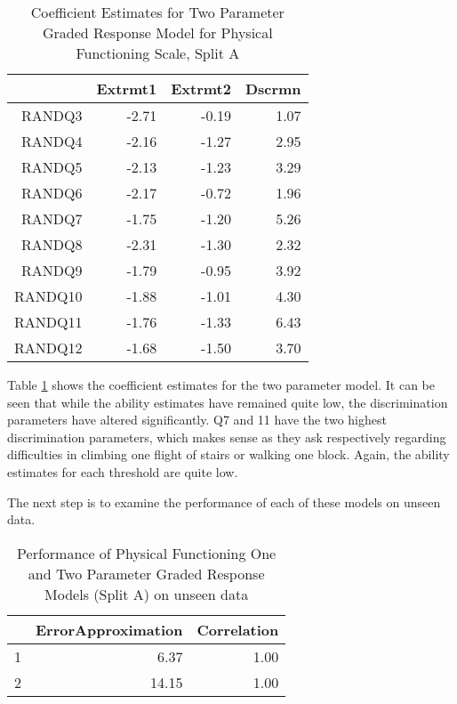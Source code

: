 \documentclass{article}
\begin{document}
\begin{table}[ht]
\centering
\begin{tabular}{rrrr}
  \hline
 & Extrmt1 & Extrmt2 & Dscrmn \\ 
  \hline
RANDQ3 & -2.71 & -0.19 & 1.07 \\ 
  RANDQ4 & -2.16 & -1.27 & 2.95 \\ 
  RANDQ5 & -2.13 & -1.23 & 3.29 \\ 
  RANDQ6 & -2.17 & -0.72 & 1.96 \\ 
  RANDQ7 & -1.75 & -1.20 & 5.26 \\ 
  RANDQ8 & -2.31 & -1.30 & 2.32 \\ 
  RANDQ9 & -1.79 & -0.95 & 3.92 \\ 
  RANDQ10 & -1.88 & -1.01 & 4.30 \\ 
  RANDQ11 & -1.76 & -1.33 & 6.43 \\ 
  RANDQ12 & -1.68 & -1.50 & 3.70 \\ 
   \hline
\end{tabular}
\caption{Coefficient Estimates for Two Parameter Graded Response Model for Physical Functioning Scale, Split A} 
\label{tab:physfun2agrm2pl}
\end{table}
Table \ref{tab:physfun2agrm2pl} shows the coefficient estimates for the two parameter model. It can  be seen that while the ability estimates have remained quite low, the discrimination parameters have altered significantly. Q7 and 11 have the two highest discrimination parameters, which makes sense as they ask respectively regarding difficulties in climbing one flight of stairs or walking one block. Again, the ability estimates for each threshold are quite low. 

The next step is to examine the performance of each of these models on unseen data. 

\clearpage

\begin{table}[ht]
\centering
\begin{tabular}{rrr}
  \hline
 & ErrorApproximation & Correlation \\ 
  \hline
1 & 6.37 & 1.00 \\ 
  2 & 14.15 & 1.00 \\ 
   \hline
\end{tabular}
\caption{Performance of Physical Functioning One and Two Parameter Graded Response Models (Split A) on unseen data} 
\label{tab:physfun2agrmtest}
\end{table}
\end{document}
